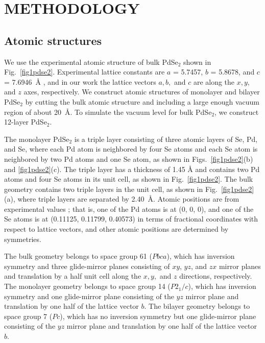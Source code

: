 \documentclass[aps,prb,longbibliography,twocolumn]{revtex4-2}
\begin{document}
\section{\label{sec2pdse2}METHODOLOGY}


\subsection{Atomic structures}


We use the experimental atomic structure of 
bulk PdSe$_2$ shown in Fig.~\ref{fig1pdse2}.
Experimental lattice constants are $a$ = 5.7457, $b$ = 5.8678, 
and $c$ = 7.6946~{\AA} \cite{Soulard2004},
and in our work the lattice vectors $a, b,$ and $c$ are along the $x, y,$ and $z$ axes, respectively. 
We construct atomic structures of monolayer and bilayer 
PdSe$_2$ 
by cutting the bulk atomic structure and including
a large enough vacuum region of about 20~{\AA}.
To simulate the vacuum level for bulk PdSe$_2$, we construct 12-layer PdSe$_2$.


The monolayer PdSe$_2$ is a triple layer consisting of three atomic layers of Se, Pd, and Se,
where each Pd atom is neighbored by four Se atoms and each Se atom is neighbored by two Pd atoms and one Se atom, as shown in Figs.~\ref{fig1pdse2}(b) and \ref{fig1pdse2}(c).
The triple layer has a thickness of 1.45 {\AA} and contains two Pd atoms and four Se atoms in its unit cell, as shown in Fig.~\ref{fig1pdse2}. 
The bulk geometry contains two triple layers in the unit cell, as shown in Fig.~\ref{fig1pdse2}(a),
where triple layers are separated by 2.40~{\AA}.
Atomic positions are from experimental values \cite{Soulard2004}; that is, one of the Pd atoms is at (0, 0, 0), and one of the Se atoms is at (0.11125, 0.11799, 0.40573) in terms of fractional coordinates with respect to lattice vectors, and other atomic positions are determined by symmetries.

The bulk geometry belongs to space group 61 ($Pbca$), which has inversion symmetry and three glide-mirror planes consisting of $xy$, $yz$, and $zx$ mirror planes and translation by a half unit cell along the $x, y,$ and $z$ directions, respectively.
The monolayer geometry belongs to space group 14 ($P2{_1}/c$), which has inversion symmetry and one glide-mirror plane consisting of the $yz$ mirror plane and translation by one half of the lattice vector $b$.
The bilayer geometry belongs to space group 7 ($Pc$), which has no inversion symmetry but one glide-mirror plane consisting of the $yz$ mirror plane and translation by one half of the lattice vector $b$.
\end{document}
